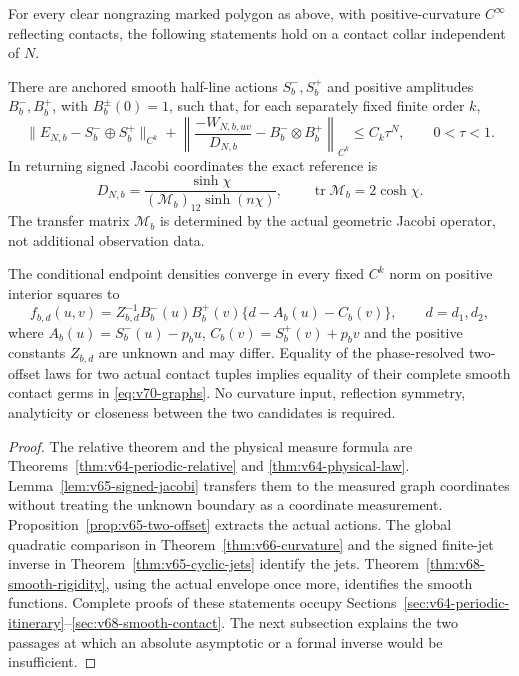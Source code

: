\begin{theorem}
\label{thm:v70-main}
For every clear nongrazing marked polygon as above, with positive-curvature
$C^\infty$ reflecting contacts, the following statements hold on a
contact collar independent of $N$.

There are anchored smooth half-line actions $S_b^-,S_b^+$ and positive
amplitudes $B_b^-,B_b^+$, with $B_b^\pm(0)=1$, such that, for each
separately fixed finite order $k$,
\begin{equation}\label{eq:v70-relative}
 \|E_{N,b}-S_b^-\oplus S_b^+\|_{C^k}
 +\left\|\frac{-W_{N,b,uv}}{D_{N,b}}
                       -B_b^-\otimes B_b^+\right\|_{C^k}
 \le C_k\tau^N,\qquad 0<\tau<1.
\end{equation}
In returning signed Jacobi coordinates the exact reference is
\begin{equation}\label{eq:v70-reference}
 D_{N,b}=\frac{\sinh\chi}
 { (\mathcal M_b)_{12}\sinh(n\chi)},\qquad
 \operatorname{tr}\mathcal M_b=2\cosh\chi.
\end{equation}
The transfer matrix $\mathcal M_b$ is determined by the actual geometric
Jacobi operator, not additional observation data.

The conditional endpoint densities converge in every fixed $C^k$ norm
on positive interior squares to
\begin{equation}\label{eq:v70-laws}
 f_{b,d}(u,v)=Z_{b,d}^{-1}B_b^-(u)B_b^+(v)
                 \{d-A_b(u)-C_b(v)\},\qquad d=d_1,d_2,
\end{equation}
where $A_b(u)=S_b^-(u)-p_bu$, $C_b(v)=S_b^+(v)+p_bv$ and
the positive constants $Z_{b,d}$ are unknown and may differ.
Equality of the phase-resolved two-offset laws for two actual contact
tuples implies equality of their complete smooth contact germs in
\eqref{eq:v70-graphs}.  No curvature input, reflection symmetry,
analyticity or closeness between the two candidates is required.
\end{theorem}

\begin{proof}
The relative theorem and the physical measure formula are
Theorems~\ref{thm:v64-periodic-relative} and
\ref{thm:v64-physical-law}.  Lemma~\ref{lem:v65-signed-jacobi}
transfers them to the measured graph coordinates without treating the
unknown boundary as a coordinate measurement.
Proposition~\ref{prop:v65-two-offset} extracts the actual actions.
The global quadratic comparison in Theorem~\ref{thm:v66-curvature}
and the signed finite-jet inverse in Theorem~\ref{thm:v65-cyclic-jets}
identify the jets.  Theorem~\ref{thm:v68-smooth-rigidity}, using the
actual envelope once more, identifies the smooth functions.  Complete
proofs of these statements occupy
Sections~\ref{sec:v64-periodic-itinerary}--\ref{sec:v68-smooth-contact}.
The next subsection explains the two passages at which an absolute
asymptotic or a formal inverse would be insufficient.
\end{proof}

